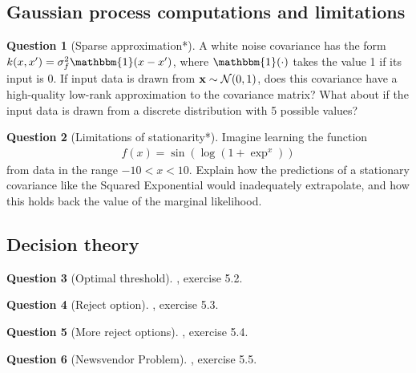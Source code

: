 \documentclass[a4paper]{article}
\theoremstyle{definition}
\newtheorem{question}{Question}
\begin{document}
\subsection{Gaussian process computations and limitations}
\begin{question}[Sparse approximation*]
\label{q:sparse-approx}
A white noise covariance has the form $k(x, x') = \sigma^2_f\mathbbm{1}\left(x - x'\right)$, where $\mathbbm{1}(\cdot)$ takes the value 1 if its input is 0. If input data is drawn from $\vx \sim \NormDist{0, 1}$, does this covariance have a high-quality low-rank approximation to the covariance matrix? What about if the input data is drawn from a discrete distribution with 5 possible values?
\end{question}

\begin{question}[Limitations of stationarity*]
\label{q:limitations-of-stationarity}
Imagine learning the function
\begin{align}
f(x) = \sin \left(\log(1+\exp^x) \right)
\end{align}
from data in the range $-10 < x < 10$. Explain how the predictions of a stationary covariance like the Squared Exponential would inadequately extrapolate, and how this holds back the value of the marginal likelihood.
\end{question}


\subsection{Decision theory}
\begin{question}[Optimal threshold]
\citet{murphy}, exercise 5.2.
\end{question}

\begin{question}[Reject option]
\citet{murphy}, exercise 5.3.
\end{question}

\begin{question}[More reject options]
\citet{murphy}, exercise 5.4.
\end{question}

\begin{question}[Newsvendor Problem]
\citet{murphy}, exercise 5.5.
\end{question}
\end{document}
